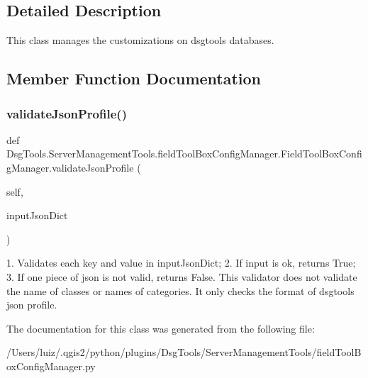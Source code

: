 \subsection{Detailed Description}
\begin{DoxyVerb}This class manages the customizations on dsgtools databases.
\end{DoxyVerb}
 

\subsection{Member Function Documentation}
\mbox{\label{class_dsg_tools_1_1_server_management_tools_1_1field_tool_box_config_manager_1_1_field_tool_box_config_manager_a99e6efddd38d57edbe49c49e1d2d409e}} 
\subsubsection{\texorpdfstring{validate\+Json\+Profile()}{validateJsonProfile()}}
{\footnotesize\ttfamily def Dsg\+Tools.\+Server\+Management\+Tools.\+field\+Tool\+Box\+Config\+Manager.\+Field\+Tool\+Box\+Config\+Manager.\+validate\+Json\+Profile (\begin{DoxyParamCaption}\item[{}]{self,  }\item[{}]{input\+Json\+Dict }\end{DoxyParamCaption})}

\begin{DoxyVerb}1. Validates each key and value in inputJsonDict;
2. If input is ok, returns True;
3. If one piece of json is not valid, returns False.
This validator does not validate the name of classes or names of categories. It only checks the format of dsgtools json profile.
\end{DoxyVerb}
 

The documentation for this class was generated from the following file\+:\begin{DoxyCompactItemize}
\item 
/\+Users/luiz/.\+qgis2/python/plugins/\+Dsg\+Tools/\+Server\+Management\+Tools/field\+Tool\+Box\+Config\+Manager.\+py\end{DoxyCompactItemize}
